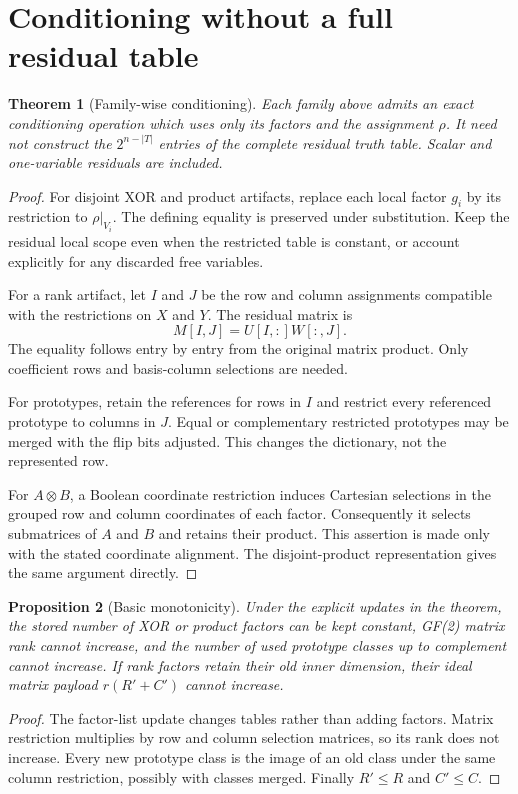 \documentclass[11pt]{article}
\newtheorem{theorem}{Theorem}[section]
\newtheorem{proposition}[theorem]{Proposition}
\theoremstyle{definition}\newtheorem{definition}[theorem]{Definition}
\theoremstyle{remark}\newtheorem{remark}[theorem]{Remark}
\begin{document}
\section{Conditioning without a full residual table}
\label{sec:closure}
\begin{theorem}[Family-wise conditioning]
Each family above admits an exact conditioning operation which uses only its factors and the assignment $\rho$. It need not construct the $2^{n-|T|}$ entries of the complete residual truth table. Scalar and one-variable residuals are included.
\end{theorem}
\begin{proof}
For disjoint XOR and product artifacts, replace each local factor $g_i$ by its restriction to $\rho|_{V_i}$. The defining equality is preserved under substitution. Keep the residual local scope even when the restricted table is constant, or account explicitly for any discarded free variables.

For a rank artifact, let $I$ and $J$ be the row and column assignments compatible with the restrictions on $X$ and $Y$. The residual matrix is
\begin{equation}
 M[I,J]=U[I,:]W[:,J].
 \label{eq:slice}
\end{equation}
The equality follows entry by entry from the original matrix product. Only coefficient rows and basis-column selections are needed.

For prototypes, retain the references for rows in $I$ and restrict every referenced prototype to columns in $J$. Equal or complementary restricted prototypes may be merged with the flip bits adjusted. This changes the dictionary, not the represented row.

For $A\otimes B$, a Boolean coordinate restriction induces Cartesian selections in the grouped row and column coordinates of each factor. Consequently it selects submatrices of $A$ and $B$ and retains their product. This assertion is made only with the stated coordinate alignment. The disjoint-product representation gives the same argument directly.
\end{proof}

\begin{proposition}[Basic monotonicity]
Under the explicit updates in the theorem, the stored number of XOR or product factors can be kept constant, GF(2) matrix rank cannot increase, and the number of used prototype classes up to complement cannot increase. If rank factors retain their old inner dimension, their ideal matrix payload $r(R'+C')$ cannot increase.
\end{proposition}
\begin{proof}
The factor-list update changes tables rather than adding factors. Matrix restriction multiplies by row and column selection matrices, so its rank does not increase. Every new prototype class is the image of an old class under the same column restriction, possibly with classes merged. Finally $R'\le R$ and $C'\le C$.
\end{proof}
\end{document}
